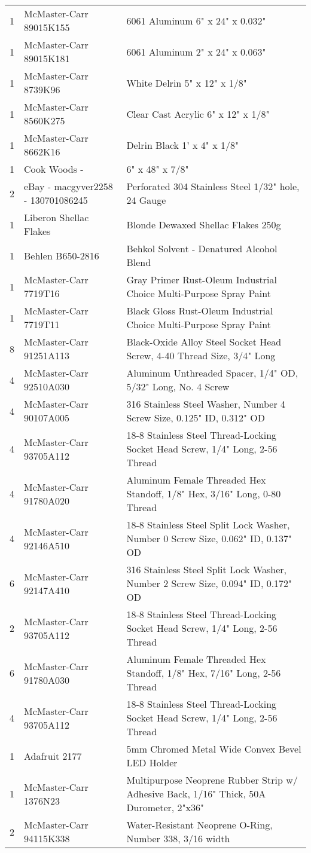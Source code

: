 \begin{longtabu}{X[1,c,m] X[6,c,m] X[9,l,m]}
  1 & McMaster-Carr 89015K155 & 6061 Aluminum 6" x 24" x 0.032" \\
  1 & McMaster-Carr 89015K181 & 6061 Aluminum 2" x 24" x 0.063" \\
  1 & McMaster-Carr 8739K96 & White Delrin 5" x 12" x 1/8" \\
  1 & McMaster-Carr 8560K275 & Clear Cast Acrylic 6" x 12" x 1/8" \\
  1 & McMaster-Carr 8662K16 & Delrin Black 1' x 4" x 1/8" \\
  1 & Cook Woods - \wood{} & 6" x 48" x 7/8" \\
  2 & eBay - macgyver2258 - 130701086245 & Perforated 304 Stainless Steel 1/32" hole, 24 Gauge \\ \mrule

  1 & Liberon Shellac Flakes & Blonde Dewaxed Shellac Flakes 250g \\
  1 & Behlen B650-2816 & Behkol Solvent - Denatured Alcohol Blend \\
  1 & McMaster-Carr 7719T16 & Gray Primer Rust-Oleum Industrial Choice Multi-Purpose Spray Paint \\
  1 & McMaster-Carr 7719T11 & Black Gloss Rust-Oleum Industrial Choice Multi-Purpose Spray Paint \\ \mrule

  8 & McMaster-Carr 91251A113 & Black-Oxide Alloy Steel Socket Head Screw, 4-40 Thread Size, 3/4" Long \\
  4 & McMaster-Carr 92510A030 & Aluminum Unthreaded Spacer, 1/4" OD, 5/32" Long, No. 4 Screw \\
  4 & McMaster-Carr 90107A005 & 316 Stainless Steel Washer, Number 4 Screw Size, 0.125" ID, 0.312" OD \\
  4 & McMaster-Carr 93705A112 & 18-8 Stainless Steel Thread-Locking Socket Head Screw, 1/4" Long, 2-56 Thread \\
  4 & McMaster-Carr 91780A020 & Aluminum Female Threaded Hex Standoff, 1/8" Hex, 3/16" Long, 0-80 Thread \\
  4 & McMaster-Carr 92146A510 & 18-8 Stainless Steel Split Lock Washer, Number 0 Screw Size, 0.062" ID, 0.137" OD \\
  6 & McMaster-Carr 92147A410 & 316 Stainless Steel Split Lock Washer, Number 2 Screw Size, 0.094" ID, 0.172" OD \\
  2 & McMaster-Carr 93705A112 & 18-8 Stainless Steel Thread-Locking Socket Head Screw, 1/4" Long, 2-56 Thread \\
  6 & McMaster-Carr 91780A030 & Aluminum Female Threaded Hex Standoff, 1/8" Hex, 7/16" Long, 2-56 Thread \\
  4 & McMaster-Carr 93705A112 & 18-8 Stainless Steel Thread-Locking Socket Head Screw, 1/4" Long, 2-56 Thread \\
  1 & Adafruit 2177 & 5mm Chromed Metal Wide Convex Bevel LED Holder \\
  1 & McMaster-Carr 1376N23 & Multipurpose Neoprene Rubber Strip w/ Adhesive Back, 1/16" Thick, 50A Durometer, 2"x36" \\
  2 & McMaster-Carr 94115K338 & Water-Resistant Neoprene O-Ring, Number 338, 3/16 width \\


\end{longtabu}
